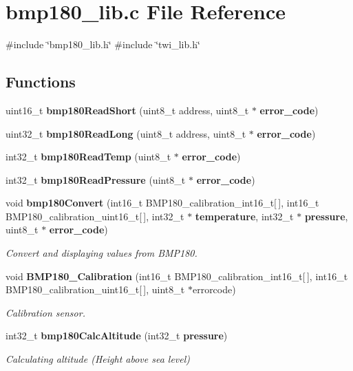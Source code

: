 \section{bmp180\+\_\+lib.\+c File Reference}
\label{bmp180__lib_8c}
{\ttfamily \#include \char`\"{}bmp180\+\_\+lib.\+h\char`\"{}}\newline
{\ttfamily \#include \char`\"{}twi\+\_\+lib.\+h\char`\"{}}\newline
\subsection*{Functions}
\begin{DoxyCompactItemize}
\item 
uint16\+\_\+t \textbf{ bmp180\+Read\+Short} (uint8\+\_\+t address, uint8\+\_\+t $\ast$\textbf{ error\+\_\+code})
\item 
uint32\+\_\+t \textbf{ bmp180\+Read\+Long} (uint8\+\_\+t address, uint8\+\_\+t $\ast$\textbf{ error\+\_\+code})
\item 
int32\+\_\+t \textbf{ bmp180\+Read\+Temp} (uint8\+\_\+t $\ast$\textbf{ error\+\_\+code})
\item 
int32\+\_\+t \textbf{ bmp180\+Read\+Pressure} (uint8\+\_\+t $\ast$\textbf{ error\+\_\+code})
\item 
void \textbf{ bmp180\+Convert} (int16\+\_\+t B\+M\+P180\+\_\+calibration\+\_\+int16\+\_\+t[$\,$], int16\+\_\+t B\+M\+P180\+\_\+calibration\+\_\+uint16\+\_\+t[$\,$], int32\+\_\+t $\ast$\textbf{ temperature}, int32\+\_\+t $\ast$\textbf{ pressure}, uint8\+\_\+t $\ast$\textbf{ error\+\_\+code})
\begin{DoxyCompactList}\small\item\em Convert and displaying values from B\+M\+P180. \end{DoxyCompactList}\item 
void \textbf{ B\+M\+P180\+\_\+\+Calibration} (int16\+\_\+t B\+M\+P180\+\_\+calibration\+\_\+int16\+\_\+t[$\,$], int16\+\_\+t B\+M\+P180\+\_\+calibration\+\_\+uint16\+\_\+t[$\,$], uint8\+\_\+t $\ast$errorcode)
\begin{DoxyCompactList}\small\item\em Calibration sensor. \end{DoxyCompactList}\item 
int32\+\_\+t \textbf{ bmp180\+Calc\+Altitude} (int32\+\_\+t \textbf{ pressure})
\begin{DoxyCompactList}\small\item\em Calculating altitude (Height above sea level) \end{DoxyCompactList}\end{DoxyCompactItemize}


